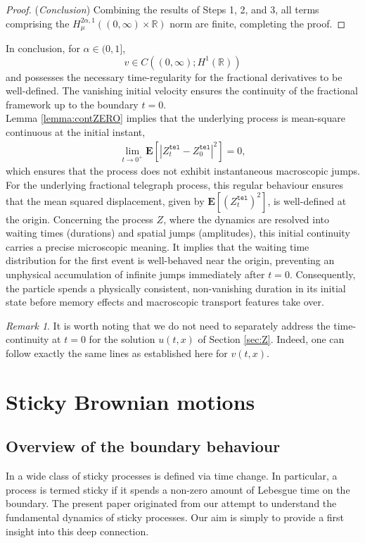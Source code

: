 \documentclass[10pt,a4paper]{article}
\numberwithin{equation}{section}
\theoremstyle{plain}
\theoremstyle{remark}
\newtheorem{remark}{Remark}
\begin{document}
\begin{proof}
({\it Conclusion})
Combining the results of Steps 1, 2, and 3, all terms comprising the $H^{2\alpha, 1}_\mu((0, \infty) \times \mathbb{R})$ norm are finite, completing the proof.
\end{proof}


In conclusion, for $\alpha \in (0,1]$,
\begin{equation*}
v\in C((0,\infty );H^{1}(\mathbb{R}))
\end{equation*}
and possesses the necessary time-regularity for the fractional derivatives to be well-defined. The vanishing initial velocity ensures the continuity of the fractional framework up to the boundary $t=0$. \\


Lemma \ref{lemma:contZERO} implies that the underlying process is mean-square continuous at the initial instant, 
\begin{align*}
\lim _{t\rightarrow 0^{+}}\mathbf{E}[|Z^\mathtt{tel}_{t}-Z^\mathtt{tel}_{0}|^{2}]=0,
\end{align*}
which ensures that the process does not exhibit instantaneous macroscopic jumps. For the underlying fractional telegraph process, this regular behaviour ensures that the mean squared displacement, given by $\mathbf{E}[(Z^\mathtt{tel}_t)^2]$, is well-defined at the origin. Concerning the process $Z$, where the dynamics are resolved into waiting times (durations) and spatial jumps (amplitudes), this initial continuity carries a precise microscopic meaning. It implies that the waiting time distribution for the first event is well-behaved near the origin, preventing an unphysical accumulation of infinite jumps immediately after $t=0$. Consequently, the particle spends a physically consistent, non-vanishing duration in its initial state before memory effects and macroscopic transport features take over.

\begin{remark}
It is worth noting that we do not need to separately address the time-continuity at $t = 0$ for the solution $u(t, x)$ of Section \ref{sec:Z}. Indeed, one can follow exactly the same lines as established here for $v(t, x)$.
\end{remark}


\section{Sticky Brownian motions}
\label{sec:Sticky}
\subsection{Overview of the boundary behaviour}
In \cite{EJP} a wide class of sticky processes is defined via time change. In particular, a process is termed sticky if it spends a non-zero amount of Lebesgue time on the boundary. The present paper originated from our attempt to understand the fundamental dynamics of sticky processes. Our aim is simply to provide a first insight into this deep connection.\\
\end{document}
